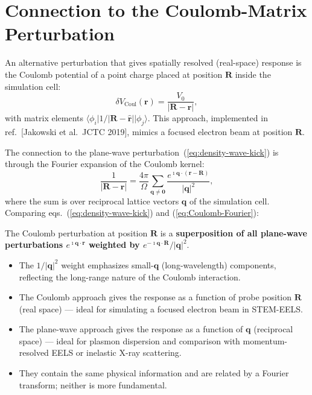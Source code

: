 \documentclass[11pt]{article}
\newcommand{\iunit}{\imath}          %
\begin{document}
\section{Connection to the Coulomb-Matrix Perturbation}

An alternative perturbation that gives spatially resolved (real-space)
response is the Coulomb potential of a point charge placed at
position $\mathbf{R}$ inside the simulation cell:
\begin{equation}
  \delta V_\mathrm{Coul}(\mathbf{r})
  = \frac{V_0}{|\mathbf{R}-\mathbf{r}|},
  \label{eq:Coulomb-pert}
\end{equation}
with matrix elements
$\langle\phi_i|1/|\mathbf{R}-\hat{\mathbf{r}}||\phi_j\rangle$.
This approach, implemented in ref.~[Jakowski et al.\ JCTC 2019],
mimics a focused electron beam at position $\mathbf{R}$.

The connection to the plane-wave perturbation~(\ref{eq:density-wave-kick})
is through the Fourier expansion of the Coulomb kernel:
\begin{equation}
  \frac{1}{|\mathbf{R}-\mathbf{r}|}
  = \frac{4\pi}{\Omega}
    \sum_{\mathbf{q}\neq\mathbf{0}}
    \frac{e^{\iunit\mathbf{q}\cdot(\mathbf{r}-\mathbf{R})}}
         {|\mathbf{q}|^2},
  \label{eq:Coulomb-Fourier}
\end{equation}
where the sum is over reciprocal lattice vectors $\mathbf{q}$ of
the simulation cell.
Comparing eqs.~(\ref{eq:density-wave-kick}) and (\ref{eq:Coulomb-Fourier}):

\begin{keyresult}
The Coulomb perturbation at position $\mathbf{R}$ is a
\textbf{superposition of all plane-wave perturbations
$e^{\iunit\mathbf{q}\cdot\mathbf{r}}$ weighted by
$e^{-\iunit\mathbf{q}\cdot\mathbf{R}}/|\mathbf{q}|^2$}.
\begin{itemize}
  \item The $1/|\mathbf{q}|^2$ weight emphasizes small-$\mathbf{q}$
    (long-wavelength) components, reflecting the long-range nature
    of the Coulomb interaction.
  \item The Coulomb approach gives the response as a function of
    probe position $\mathbf{R}$ (real space) --- ideal for simulating
    a focused electron beam in STEM-EELS.
  \item The plane-wave approach gives the response as a function of
    $\mathbf{q}$ (reciprocal space) --- ideal for plasmon dispersion
    and comparison with momentum-resolved EELS or inelastic X-ray
    scattering.
  \item They contain the same physical information and are
    related by a Fourier transform; neither is more fundamental.
\end{itemize}
\end{keyresult}
\end{document}
